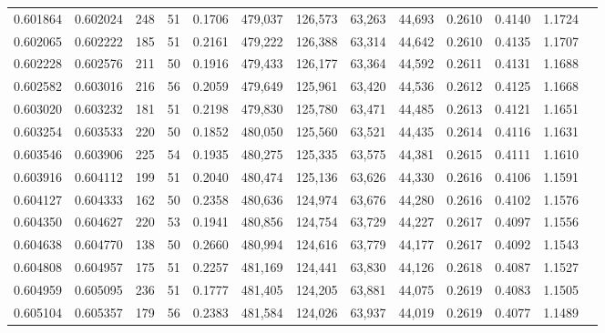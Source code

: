 \begin{tabular}{rrrrrrrrrrrrr}
0.601864 & 0.602024 &    248 &    51 &                                     0.1706 & 479,037 & 126,573 &  63,263 &  44,693 & 0.2610 & 0.4140 & 1.1724 \\
0.602065 & 0.602222 &    185 &    51 &                                     0.2161 & 479,222 & 126,388 &  63,314 &  44,642 & 0.2610 & 0.4135 & 1.1707 \\
0.602228 & 0.602576 &    211 &    50 &                                     0.1916 & 479,433 & 126,177 &  63,364 &  44,592 & 0.2611 & 0.4131 & 1.1688 \\
0.602582 & 0.603016 &    216 &    56 &                                     0.2059 & 479,649 & 125,961 &  63,420 &  44,536 & 0.2612 & 0.4125 & 1.1668 \\
0.603020 & 0.603232 &    181 &    51 &                                     0.2198 & 479,830 & 125,780 &  63,471 &  44,485 & 0.2613 & 0.4121 & 1.1651 \\
0.603254 & 0.603533 &    220 &    50 &                                     0.1852 & 480,050 & 125,560 &  63,521 &  44,435 & 0.2614 & 0.4116 & 1.1631 \\
0.603546 & 0.603906 &    225 &    54 &                                     0.1935 & 480,275 & 125,335 &  63,575 &  44,381 & 0.2615 & 0.4111 & 1.1610 \\
0.603916 & 0.604112 &    199 &    51 &                                     0.2040 & 480,474 & 125,136 &  63,626 &  44,330 & 0.2616 & 0.4106 & 1.1591 \\
0.604127 & 0.604333 &    162 &    50 &                                     0.2358 & 480,636 & 124,974 &  63,676 &  44,280 & 0.2616 & 0.4102 & 1.1576 \\
0.604350 & 0.604627 &    220 &    53 &                                     0.1941 & 480,856 & 124,754 &  63,729 &  44,227 & 0.2617 & 0.4097 & 1.1556 \\
0.604638 & 0.604770 &    138 &    50 &                                     0.2660 & 480,994 & 124,616 &  63,779 &  44,177 & 0.2617 & 0.4092 & 1.1543 \\
0.604808 & 0.604957 &    175 &    51 &                                     0.2257 & 481,169 & 124,441 &  63,830 &  44,126 & 0.2618 & 0.4087 & 1.1527 \\
0.604959 & 0.605095 &    236 &    51 &                                     0.1777 & 481,405 & 124,205 &  63,881 &  44,075 & 0.2619 & 0.4083 & 1.1505 \\
0.605104 & 0.605357 &    179 &    56 &                                     0.2383 & 481,584 & 124,026 &  63,937 &  44,019 & 0.2619 & 0.4077 & 1.1489 \\

\end{tabular}
